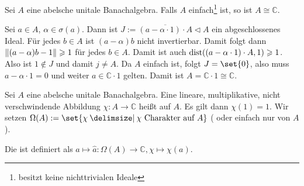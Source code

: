 \begin{proposition}[label=prop1.11_einfach]
	Sei $A$ eine abelsche unitale Banachalgebra. Falls $A$ einfach\footnote{besitzt keine nichttrivialen Ideale} ist, so ist $A \cong \mathbb{C}$. 
\end{proposition}
\begin{beweis}
	Sei $a \in A$, $\alpha \in \sigma(a)$. Dann ist $J := \overline{(a-\alpha \cdot 1)\cdot A} \lhd A$ ein abgeschlossenes Ideal. Für jedes $b \in A$ ist $(a-\alpha)b$ nicht 
	invertierbar. Damit folgt dann $\norm{(a-\alpha)b - 1}\ge 1$ für jedes $b \in A$. Damit ist auch $\dist\enbrace*{(a-\alpha \cdot 1)\cdot A,1}\ge 1$. Also ist $1 \notin J$ und 
	damit $j \not= A$. Da $A$ einfach ist, folgt $J=\set{0}$, also muss $a-\alpha \cdot 1=0$ und weiter $a \in \mathbb{C} \cdot 1$ gelten. Damit ist 
	$A = \mathbb{C} \cdot 1 \cong \mathbb{C}$.
\end{beweis}

\begin{definition}[{name=[Charakter]}]
	Sei $A$ eine abelsche unitale Banachalgebra. Eine lineare, multiplikative, nicht verschwindende Abbildung $\chi \colon A \to \mathbb{C}$ heißt  auf $A$.  
	Es gilt dann $\chi(1)=1$. Wir setzen $\Omega(A) := \set{\chi \given \chi \text{ Charakter auf }A}$ ( oder einfach nur  von $A$).
	
	Die  ist definiert als 
	$a \mapsto \hat{a} \colon \Omega(A) \to \mathbb{C}, \chi \mapsto \chi(a)$.
\end{definition}


